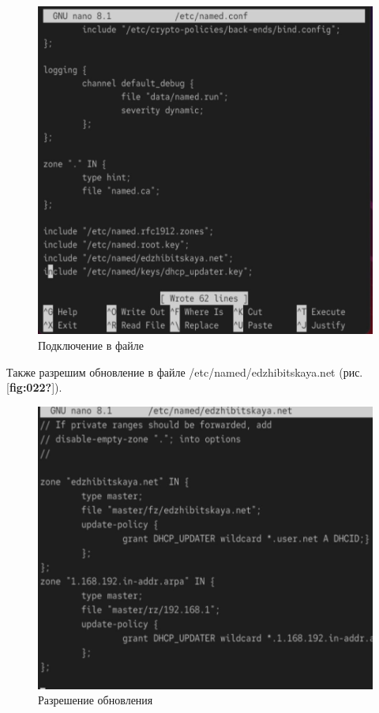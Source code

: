 \documentclass[
  english,
  russian,
  12pt,
  a4paper,
  DIV=11,
  numbers=noendperiod]{scrreprt}
\begin{document}
\begin{figure}

{\centering \includegraphics[width=0.7\linewidth,height=\textheight,keepaspectratio]{image/21.jpg}

}

\caption{Подключение в файле}

\end{figure}%

Также разрешим обновление в файле /etc/named/edzhibitskaya.net (рис.
{[}\textbf{fig:022?}{]}).

\begin{figure}

{\centering \includegraphics[width=0.7\linewidth,height=\textheight,keepaspectratio]{image/22.jpg}

}

\caption{Разрешение обновления}

\end{figure}%
\end{document}
